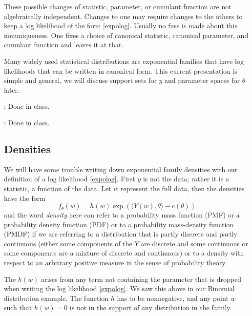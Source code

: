 \documentclass[
]{article}
\begin{document}
These possible changes of statistic, parameter, or cumulant function are
not algebraically independent. Changes to one may require changes to the
others to keep a log likelihood of the form \eqref{expolog}. Usually no
fuss is made about this nonuniqueness. One fixes a choice of canonical
statistic, canonical parameter, and cumulant function and leaves it at
that.

Many widely used statistical distributions are exponential families that
have log likelihoods that can be written in canonical form. This current
presentation is simple and general, we will discuss support sets for
\(y\) and parameter spaces for \(\theta\) later.

\vspace{0.5cm}

: Done in class.

\vspace{0.5cm}

: Done in class.

\hypertarget{densities}{%
\subsection{Densities}\label{densities}}

We will have some trouble writing down exponential family densities with
our definition of a log likelihood \eqref{expolog}. First \(y\) is not
the data; rather it is a statistic, a function of the data. Let \(w\)
represent the full data, then the densities have the form
\begin{equation} \label{expodens}
  f_\theta(w) = h(w)\exp\left(\langle Y(w),\theta \rangle - c(\theta)\right)
\end{equation} and the word \emph{density} here can refer to a
probability mass function (PMF) or a probability density function (PDF)
or to a probability mass-density function (PMDF) if we are referring to
a distribution that is partly discrete and partly continuous (either
some components of the \(Y\) are discrete and some continuous or some
components are a mixture of discrete and continuous) or to a density
with respect to an arbitrary positive measure in the sense of
probability theory.

The \(h(w)\) arises from any term not containing the parameter that is
dropped when writing the log likelihood \eqref{expolog}. We saw this
above in our Binomial distribution example. The function \(h\) has to be
nonnegative, and any point \(w\) such that \(h(w) = 0\) is not in the
support of any distribution in the family.
\end{document}
